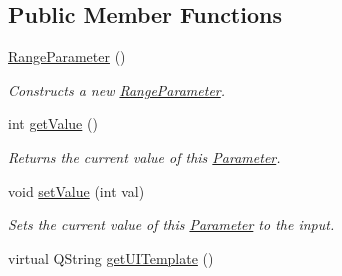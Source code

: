 \subsection*{Public Member Functions}
\begin{DoxyCompactItemize}
\item 
\hyperlink{class_picto_1_1_range_parameter_adc1329819be9c9603521f61dcb630ed1}{Range\-Parameter} ()
\begin{DoxyCompactList}\small\item\em Constructs a new \hyperlink{class_picto_1_1_range_parameter}{Range\-Parameter}. \end{DoxyCompactList}\item 
\hypertarget{class_picto_1_1_range_parameter_a16a84b11483152828274e296e78d2f7f}{int \hyperlink{class_picto_1_1_range_parameter_a16a84b11483152828274e296e78d2f7f}{get\-Value} ()}\label{class_picto_1_1_range_parameter_a16a84b11483152828274e296e78d2f7f}

\begin{DoxyCompactList}\small\item\em Returns the current value of this \hyperlink{class_picto_1_1_parameter}{Parameter}. \end{DoxyCompactList}\item 
\hypertarget{class_picto_1_1_range_parameter_af1922573bb9ca820ce9796deb6b07245}{void \hyperlink{class_picto_1_1_range_parameter_af1922573bb9ca820ce9796deb6b07245}{set\-Value} (int val)}\label{class_picto_1_1_range_parameter_af1922573bb9ca820ce9796deb6b07245}

\begin{DoxyCompactList}\small\item\em Sets the current value of this \hyperlink{class_picto_1_1_parameter}{Parameter} to the input. \end{DoxyCompactList}\item 
\hypertarget{class_picto_1_1_range_parameter_aad4c371998200fcd549a3af78cb86366}{virtual Q\-String \hyperlink{class_picto_1_1_range_parameter_aad4c371998200fcd549a3af78cb86366}{get\-U\-I\-Template} ()}\label{class_picto_1_1_range_parameter_aad4c371998200fcd549a3af78cb86366}


\end{DoxyCompactItemize}
